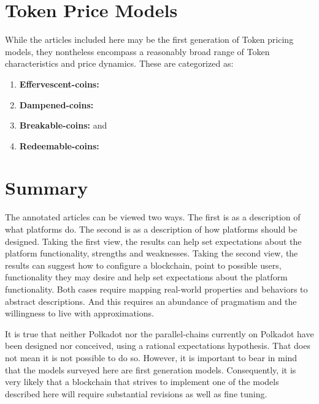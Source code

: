 \documentclass[11pt]{article}
\begin{document}
\section{Token Price Models}

While the articles included here may be the first generation of Token pricing models, they nontheless encompass a reasonably broad range of Token characteristics and price dynamics. These are categorized as:

\begin{enumerate}
    \item \textbf{Effervescent-coins:} 
    \item \textbf{Dampened-coins:} 
    \item \textbf{Breakable-coins:}  and 
    \item \textbf{Redeemable-coins:} 
\end{enumerate}

\section{Summary}

The annotated articles can be viewed two ways. The first is as a description of what platforms do. The second is as a description of how platforms should be designed. Taking the first view, the results can help set expectations about the platform functionality, strengths and weaknesses. Taking the second view, the results can suggest how to configure a blockchain, point to possible users, functionality they may desire and help set expectations about the platform functionality. Both cases require mapping real-world properties and behaviors to abstract descriptions. And this requires an abundance of pragmatism and the willingness to live with approximations.

It is true that neither Polkadot nor the parallel-chains currently on Polkadot have been designed nor conceived, using a rational expectations hypothesis.  That does not mean it is not possible to do so.  However, it is important to bear in mind that the models surveyed here are first generation models. Consequently, it is very likely that a blockchain that strives to implement one of the models described here will require substantial revisions as well as fine tuning.

\clearpage
\begin{refsection}
\nocite{long20,cong21,cong22,sockin23a,sockin23b,rogoff22}
\printbibliography[heading=bibnumbered]
\end{refsection}
\end{document}
